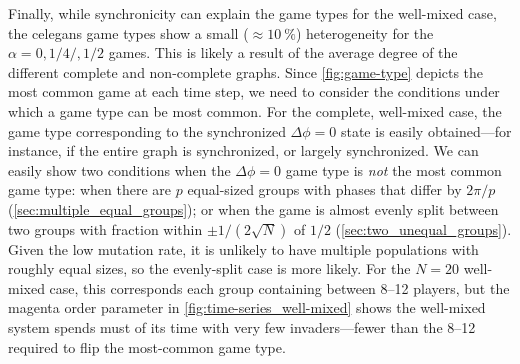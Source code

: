 \documentclass[pdflatex,lineno,referee,sn-mathphys-ay]{sn-jnl}
\begin{document}
Finally, while synchronicity can explain the game types
for the
 well-mixed case,
the
 \gls{celegans} game types
show a small ($\approx \SI{10}{\percent}$)
heterogeneity for the $\alpha = 0,1/4/,1/2$ games.
This is likely a result of the average degree
of the different complete and non-complete graphs.
Since \cref{fig:game-type} depicts the most common game at each time step,
we need to consider the conditions under which a game type can be most common.
For the complete, well-mixed case, the game type corresponding
to the synchronized $\Delta \phi = 0$ state
is easily obtained---for instance, if the entire graph is synchronized,
or largely synchronized.
We can easily show two conditions when the $\Delta \phi = 0$ game type
is \emph{not} the most common game type:
when there are $p$ equal-sized groups
with phases that differ by $2 \pi/p$ (\cf \cref{sec:multiple_equal_groups});
or when the game is almost evenly split between two groups
with fraction within $\pm 1/(2 \sqrt{N})$ of $1/2$
(\cf \cref{sec:two_unequal_groups}).
Given the low mutation rate, it is unlikely to have
multiple populations with roughly equal sizes,
so the evenly-split case is more likely.
For the $N = 20$ well-mixed case, this corresponds
each group containing between \numrange{8}{12} players,
but the magenta order parameter in \cref{fig:time-series_well-mixed}
shows the well-mixed system spends must of its time with very few invaders---fewer
than the \numrange{8}{12} required to flip the most-common game type.
\end{document}
